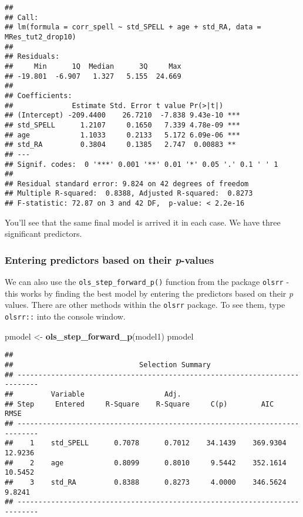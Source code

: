 \documentclass[
]{book}
\newenvironment{Shaded}{\begin{snugshade}}{\end{snugshade}}
\newcommand{\FunctionTok}[1]{\textcolor[rgb]{0.13,0.29,0.53}{\textbf{#1}}}
\newcommand{\NormalTok}[1]{#1}
\newcommand{\OtherTok}[1]{\textcolor[rgb]{0.56,0.35,0.01}{#1}}
\begin{document}
\begin{verbatim}
## 
## Call:
## lm(formula = corr_spell ~ std_SPELL + age + std_RA, data = MRes_tut2_drop10)
## 
## Residuals:
##     Min      1Q  Median      3Q     Max 
## -19.801  -6.907   1.327   5.155  24.669 
## 
## Coefficients:
##              Estimate Std. Error t value Pr(>|t|)    
## (Intercept) -209.4400    26.7210  -7.838 9.43e-10 ***
## std_SPELL      1.2107     0.1650   7.339 4.78e-09 ***
## age            1.1033     0.2133   5.172 6.09e-06 ***
## std_RA         0.3804     0.1385   2.747  0.00883 ** 
## ---
## Signif. codes:  0 '***' 0.001 '**' 0.01 '*' 0.05 '.' 0.1 ' ' 1
## 
## Residual standard error: 9.824 on 42 degrees of freedom
## Multiple R-squared:  0.8388, Adjusted R-squared:  0.8273 
## F-statistic: 72.87 on 3 and 42 DF,  p-value: < 2.2e-16
\end{verbatim}

You'll see that the same final model is arrived it in each case. We have three significant predictors.

\hypertarget{entering-predictors-based-on-their-p-values}{%
\subsubsection*{\texorpdfstring{Entering predictors based on their \emph{p}-values}{Entering predictors based on their p-values}}\label{entering-predictors-based-on-their-p-values}}

We can also use the \texttt{ols\_step\_forward\_p()} function from the package \texttt{olsrr} - this works by finding the best model by entering the predictors based on their \emph{p} values. There are other methods within the \texttt{olsrr} package. To see them, type \texttt{olsrr::} into the console window.

\begin{Shaded}
\begin{Highlighting}[]
\NormalTok{pmodel }\OtherTok{\textless{}{-}} \FunctionTok{ols\_step\_forward\_p}\NormalTok{(model1)}
\NormalTok{pmodel}
\end{Highlighting}
\end{Shaded}

\begin{verbatim}
## 
##                              Selection Summary                              
## ---------------------------------------------------------------------------
##         Variable                   Adj.                                        
## Step     Entered     R-Square    R-Square     C(p)        AIC        RMSE      
## ---------------------------------------------------------------------------
##    1    std_SPELL      0.7078      0.7012    34.1439    369.9304    12.9236    
##    2    age            0.8099      0.8010     9.5442    352.1614    10.5452    
##    3    std_RA         0.8388      0.8273     4.0000    346.5624     9.8241    
## ---------------------------------------------------------------------------
\end{verbatim}
\end{document}
